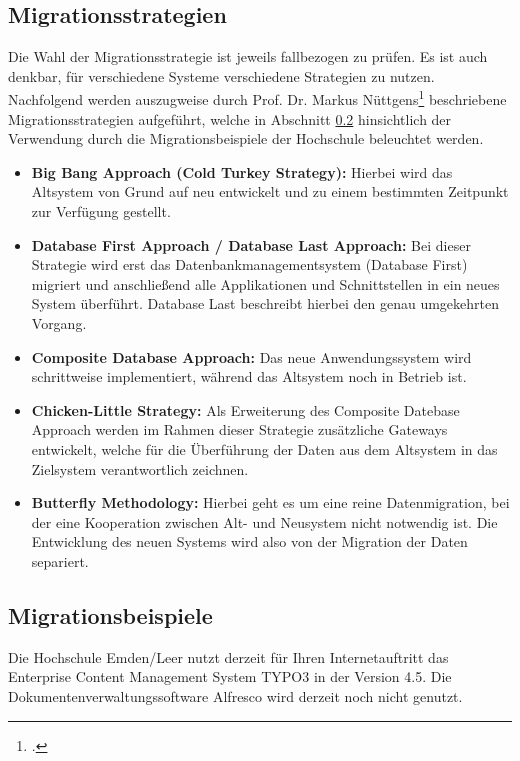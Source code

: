 \subsection{Migrationsstrategien}
Die Wahl der Migrationsstrategie ist jeweils fallbezogen zu prüfen. Es ist auch denkbar, für verschiedene Systeme verschiedene Strategien zu nutzen. Nachfolgend werden auszugweise durch Prof. Dr. Markus Nüttgens\footcite{nuettgens_abloesung_2014} beschriebene Migrationsstrategien aufgeführt, welche in Abschnitt \ref{subsection_migrationsbeispiele} hinsichtlich der Verwendung durch die Migrationsbeispiele der Hochschule beleuchtet werden.

\begin{itemize}
	\item \textbf{Big Bang Approach (Cold Turkey Strategy):} Hierbei wird das Altsystem von Grund auf neu entwickelt und zu einem bestimmten Zeitpunkt zur Verfügung gestellt.	
	
	\item \textbf{Database First Approach / Database Last Approach:} Bei dieser Strategie wird erst das Datenbankmanagementsystem (Database First) migriert und anschließend alle Applikationen und Schnittstellen in ein neues System überführt. Database Last beschreibt hierbei den genau umgekehrten Vorgang.
	
	\item \textbf{Composite Database Approach:} Das neue Anwendungssystem wird schrittweise implementiert, während das Altsystem noch in Betrieb ist.
	
	\item \textbf{Chicken-Little Strategy:} Als Erweiterung des Composite Datebase Approach werden im Rahmen dieser Strategie zusätzliche Gateways entwickelt, welche für die Überführung der Daten aus dem Altsystem in das Zielsystem verantwortlich zeichnen.
	
	\item \textbf{Butterfly Methodology:} Hierbei geht es um eine reine Datenmigration, bei der eine Kooperation zwischen Alt- und Neusystem nicht notwendig ist.  Die Entwicklung des neuen Systems wird also von der Migration der Daten separiert.
\end{itemize}


\subsection{Migrationsbeispiele}
\label{subsection_migrationsbeispiele}

Die Hochschule Emden/Leer nutzt derzeit für Ihren Internetauftritt das Enterprise Content Management System TYPO3 in der Version 4.5. Die Dokumentenverwaltungssoftware Alfresco wird derzeit noch nicht genutzt. 

